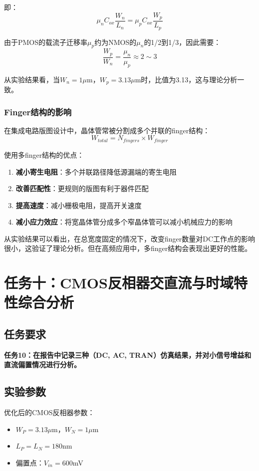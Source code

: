 \documentclass[UTF8,12pt,a4paper]{ctexart}
\begin{document}
即：
\begin{equation}
\mu_n C_{ox}\frac{W_n}{L_n} = \mu_p C_{ox}\frac{W_p}{L_p}
\end{equation}

由于PMOS的载流子迁移率$\mu_p$约为NMOS的$\mu_n$的1/2到1/3，因此需要：
\begin{equation}
\frac{W_p}{W_n} = \frac{\mu_n}{\mu_p} \approx 2 \sim 3
\end{equation}

从实验结果看，当$W_n = 1\mu$m，$W_p = 3.13\mu$m时，比值为3.13，这与理论分析一致。

\subsubsection{Finger结构的影响}
在集成电路版图设计中，晶体管常被分割成多个并联的finger结构：
\begin{equation}
W_{total} = N_{fingers} \times W_{finger}
\end{equation}

使用多finger结构的优点：
\begin{enumerate}
\item \textbf{减小寄生电阻}：多个并联路径降低源漏端的寄生电阻
\item \textbf{改善匹配性}：更规则的版图有利于器件匹配
\item \textbf{提高速度}：减小栅极电阻，提高开关速度
\item \textbf{减小应力效应}：将宽晶体管分成多个窄晶体管可以减小机械应力的影响
\end{enumerate}

从实验结果可以看出，在总宽度固定的情况下，改变finger数量对DC工作点的影响很小，这验证了理论分析。但在高频应用中，多finger结构会表现出更好的性能。





\newpage
\section{任务十：CMOS反相器交直流与时域特性综合分析}

\subsection{任务要求}
\textbf{任务10：在报告中记录三种（DC, AC, TRAN）仿真结果，并对小信号增益和直流偏置情况进行分析。}

\subsection{实验参数}
优化后的CMOS反相器参数：
\begin{itemize}
\item $W_P = 3.13\mu$m，$W_N = 1\mu$m
\item $L_P = L_N = 180$nm
\item 偏置点：$V_{in} = 600$mV
\end{itemize}
\end{document}
